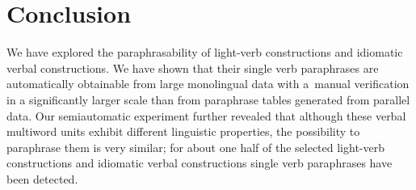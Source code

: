 \documentclass[output=paper,modfonts,nonflat]{langsci/langscibook}
\begin{document}
\section{Conclusion}
We have explored the paraphrasability of   light-verb constructions and 
idiomatic verbal constructions. We have shown that their single verb 
paraphrases are automatically obtainable from large monolingual data with 
a~manual verification in a significantly larger scale than from paraphrase 
tables generated from parallel data. Our 
semiautomatic experiment further revealed that although these verbal multiword 
units exhibit different linguistic properties, the possibility to paraphrase
them is very similar; for about one half of the selected light-verb constructions 
and idiomatic verbal constructions single verb paraphrases have been detected.
\end{document}
